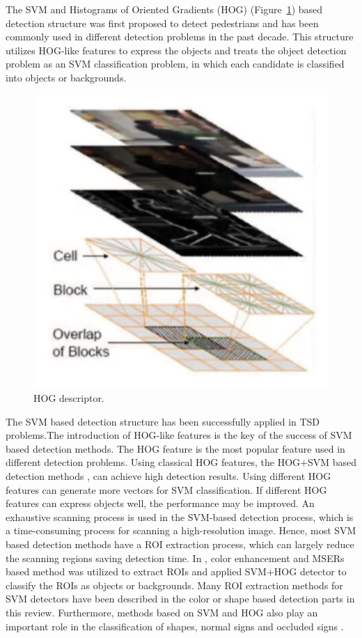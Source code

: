 \documentclass[letterpaper, 10 pt, conference]{ieeeconf}
\begin{document}
The SVM and Histograms of Oriented Gradients (HOG) (Figure~\ref{fig:hog_descriptor}) \cite{Swathi2017} based detection structure was first proposed to detect pedestrians and has been commonly used in different detection problems in the past decade. This structure utilizes HOG-like features to express the objects and treats the object detection problem as an SVM classification problem, in which each candidate is classified into objects or backgrounds.

\begin{figure}[!t]
    \centering
    \includegraphics[width=0.9\linewidth]{figures/hog_descriptor.jpg} 
    \caption{HOG descriptor.}
    \label{fig:hog_descriptor}
\end{figure}

The SVM based detection structure has been successfully applied in TSD problems.The introduction of HOG-like features is the key of the success of SVM based detection methods. The HOG feature \cite{Dalal2005} is the most popular feature used in different detection problems. Using classical HOG features, the HOG+SVM based detection methods \cite{Salti2015}, \cite{Zaklouta2014} can achieve high detection results. Using different HOG features can generate more vectors for SVM classification. If different HOG features can express objects well, the performance may be improved. An exhaustive scanning process is used in the SVM-based detection process, which is a time-consuming process for scanning a high-resolution image. Hence, most SVM based detection methods have a ROI extraction process, which can largely reduce the scanning regions saving detection time. In \cite{Zaklouta2014}, color enhancement and MSERs based method was utilized to extract ROIs and applied SVM+HOG detector to classify the ROIs as objects or backgrounds. Many ROI extraction methods for SVM detectors have been described in the color or shape based detection parts in this review. Furthermore, methods based on SVM and HOG also play an important role in the classification of shapes, normal signs and occluded signs \cite{Hou2017}.
\end{document}
